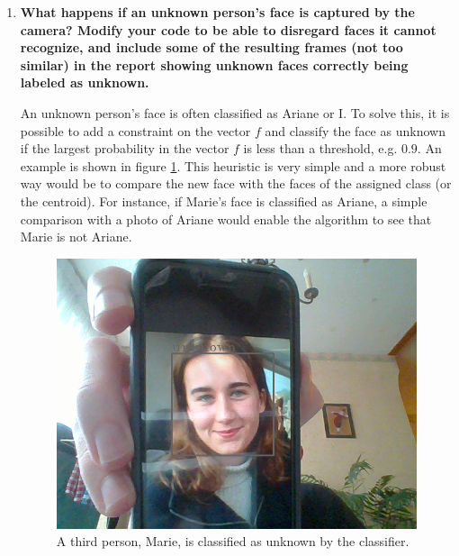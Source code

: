 \documentclass[a4paper, 11pt]{report}
\begin{document}
\begin{enumerate}
	\item \textbf{What happens if an unknown person's face is captured by the camera? Modify your code to be able to disregard faces it cannot recognize,
	and include some of the resulting frames (not too similar) in the report showing unknown faces correctly being labeled as unknown.}
	
	An unknown person's face is often classified as Ariane or I. To solve this, it is possible to add a constraint on the vector $f$ and classify the face as unknown if the largest probability in the vector $f$ is less than a threshold, e.g. $0.9$. An example is shown in figure \ref{fig:marie-unknown}. This heuristic is very simple and a more robust way would be to compare the new face with the faces of the assigned class (or the centroid). For instance, if Marie's face is classified as Ariane, a simple comparison with a photo of Ariane would enable the algorithm to see that Marie is not Ariane.
	
	\begin{figure}[!h]
	    \centering
	    \includegraphics[width=.6\textwidth]{images/q34_marie_unknown.png}
	    \caption{A third person, Marie, is classified as unknown by the classifier.}
	    \label{fig:marie-unknown}
	\end{figure}
	
\end{enumerate}
\end{document}

